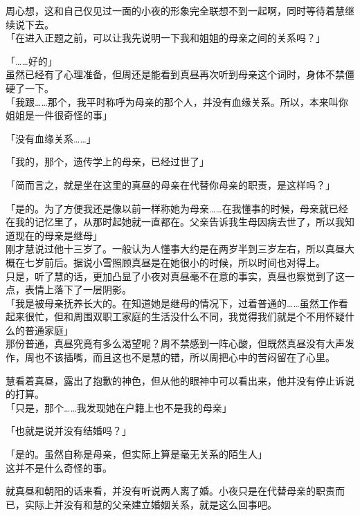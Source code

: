 周心想，这和自己仅见过一面的小夜的形象完全联想不到一起啊，同时等待着慧继续说下去。\\

「在进入正题之前，可以让我先说明一下我和姐姐的母亲之间的关系吗？」

「……好的」\\

虽然已经有了心理准备，但周还是能看到真昼再次听到母亲这个词时，身体不禁僵硬了一下。\\

「我跟……那个，我平时称呼为母亲的那个人，并没有血缘关系。所以，本来叫你姐姐是一件很奇怪的事」

「没有血缘关系……」

「我的，那个，遗传学上的母亲，已经过世了」

「简而言之，就是坐在这里的真昼的母亲在代替你母亲的职责，是这样吗？」

「是的。为了方便我还是像以前一样称她为母亲……在我懂事的时候，母亲就已经在我的记忆里了，从那时起她就一直都在。父亲告诉我生母因病去世了，所以我知道现在的母亲是继母」\\

刚才慧说过他十三岁了。一般认为人懂事大约是在两岁半到三岁左右，所以真昼大概在七岁前后。据说小雪照顾真昼是在她很小的时候，所以时间也对得上。\\

只是，听了慧的话，更加凸显了小夜对真昼毫不在意的事实，真昼也察觉到了这一点，表情上落下了一层阴影。\\

「我是被母亲抚养长大的。在知道她是继母的情况下，过着普通的……虽然工作看起来很忙，但和周围双职工家庭的生活没什么不同，我觉得我们就是个不用怀疑什么的普通家庭」\\

那份普通，真昼究竟有多么渴望呢？周不禁感到一阵心酸，但既然真昼没有大声发作，周也不该插嘴，而且这也不是慧的错，所以周把心中的苦闷留在了心里。

慧看着真昼，露出了抱歉的神色，但从他的眼神中可以看出来，他并没有停止诉说的打算。\\

「只是，那个……我发现她在户籍上也不是我的母亲」

「也就是说并没有结婚吗？」

「是的。虽然自称是母亲，但实际上算是毫无关系的陌生人」\\

这并不是什么奇怪的事。

就真昼和朝阳的话来看，并没有听说两人离了婚。小夜只是在代替母亲的职责而已，实际上并没有和慧的父亲建立婚姻关系，就是这么回事吧。\\

